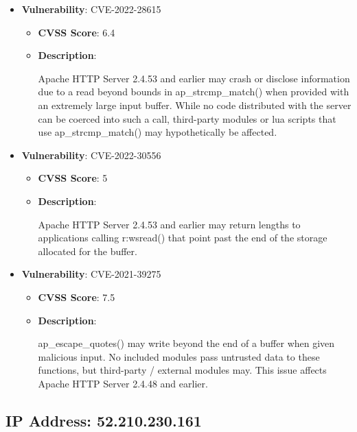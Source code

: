 \documentclass{article}
\begin{document}
\begin{itemize}
        \item \textbf{Vulnerability}: CVE-2022-28615
        \begin{itemize}
            \item \textbf{CVSS Score}:  6.4 
            \item \textbf{Description}:
            \parbox[t]{0.9\linewidth}{
                \ttfamily Apache HTTP Server 2.4.53 and earlier may crash or disclose information due to a read beyond bounds in ap\_strcmp\_match() when provided with an extremely large input buffer. While no code distributed with the server can be coerced into such a call, third-party modules or lua scripts that use ap\_strcmp\_match() may hypothetically be affected.
            }
        \end{itemize}
    
        \item \textbf{Vulnerability}: CVE-2022-30556
        \begin{itemize}
            \item \textbf{CVSS Score}:  5 
            \item \textbf{Description}:
            \parbox[t]{0.9\linewidth}{
                \ttfamily Apache HTTP Server 2.4.53 and earlier may return lengths to applications calling r:wsread() that point past the end of the storage allocated for the buffer.
            }
        \end{itemize}
    
        \item \textbf{Vulnerability}: CVE-2021-39275
        \begin{itemize}
            \item \textbf{CVSS Score}:  7.5 
            \item \textbf{Description}:
            \parbox[t]{0.9\linewidth}{
                \ttfamily ap\_escape\_quotes() may write beyond the end of a buffer when given malicious input. No included modules pass untrusted data to these functions, but third-party / external modules may. This issue affects Apache HTTP Server 2.4.48 and earlier.
            }
        \end{itemize}
    
\end{itemize}




\clearpage



\subsection*{IP Address: 52.210.230.161}
\end{document}
